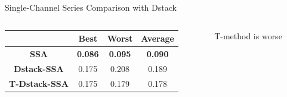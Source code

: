 \documentclass[pdf, unicode, ucs, notheorems]{beamer}
\newcommand{\bluetext}[1]{{\usebeamercolor[fg]{bluetext_color}#1}}
\theoremstyle{definition}
\begin{document}
\begin{frame}{Single-Channel Series Comparison with Dstack}
  \begin{columns}
    \begin{column}{0.7\textwidth}
      \begin{table}[ht]
        \centering
        \begin{tabular}{c|ccc}
          \hline
          & Best & Worst & Average \\
          \hline
          \textbf{SSA} & \textbf{\bluetext{0.086}} &
          \textbf{\bluetext{0.095}} &
          \textbf{\bluetext{0.090}} \\
          \textbf{Dstack-SSA} & 0.175 & 0.208 & 0.189 \\
          \textbf{T-Dstack-SSA} & 0.175 & 0.179 & 0.178 \\
          \hline
        \end{tabular}
      \end{table}
    \end{column}
    \begin{column}{0.3\textwidth}
      T-method is worse
    \end{column}
  \end{columns}
\end{frame}


\end{document}
